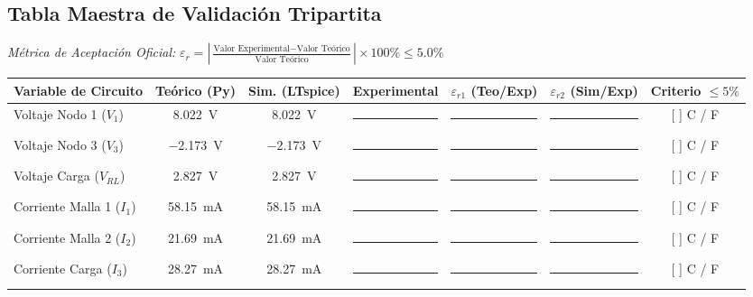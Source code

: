 \documentclass[11pt, a4paper]{article}
\begin{document}
\newpage
\begin{landscape}
\section{Tabla Maestra de Validación Tripartita}
\textit{Métrica de Aceptación Oficial:} $\varepsilon_r = \left\vert \frac{\text{Valor Experimental} - \text{Valor Teórico}}{\text{Valor Teórico}} \right\vert \times 100\% \le 5.0\%$

\vspace{0.6cm}
\begin{table}[h!]
    \centering
    \renewcommand{\arraystretch}{1.8}
    \begin{tabularx}{\linewidth}{@{}Xcccccc@{}}
        \toprule
        \textbf{Variable de Circuito} & \textbf{Teórico (Py)} & \textbf{Sim. (LTspice)} & \textbf{Experimental} & \textbf{$\varepsilon_{r1}$ (Teo/Exp)} & \textbf{$\varepsilon_{r2}$ (Sim/Exp)} & \textbf{Criterio $\le 5\%$} \\
        \midrule
        Voltaje Nodo 1 ($V_1$) & \qty{8.022}{\volt} & \qty{8.022}{\volt} & \rule{3cm}{0.4pt} & \rule{2cm}{0.4pt} & \rule{2cm}{0.4pt} & [ ] C \quad / \quad [ ] F \\
        Voltaje Nodo 3 ($V_3$) & \qty{-2.173}{\volt} & \qty{-2.173}{\volt} & \rule{3cm}{0.4pt} & \rule{2cm}{0.4pt} & \rule{2cm}{0.4pt} & [ ] C \quad / \quad [ ] F \\
        Voltaje Carga ($V_{RL}$) & \qty{2.827}{\volt} & \qty{2.827}{\volt} & \rule{3cm}{0.4pt} & \rule{2cm}{0.4pt} & \rule{2cm}{0.4pt} & [ ] C \quad / \quad [ ] F \\
        Corriente Malla 1 ($I_1$) & \qty{58.15}{\milli\ampere} & \qty{58.15}{\milli\ampere} & \rule{3cm}{0.4pt} & \rule{2cm}{0.4pt} & \rule{2cm}{0.4pt} & [ ] C \quad / \quad [ ] F \\
        Corriente Malla 2 ($I_2$) & \qty{21.69}{\milli\ampere} & \qty{21.69}{\milli\ampere} & \rule{3cm}{0.4pt} & \rule{2cm}{0.4pt} & \rule{2cm}{0.4pt} & [ ] C \quad / \quad [ ] F \\
        Corriente Carga ($I_3$) & \qty{28.27}{\milli\ampere} & \qty{28.27}{\milli\ampere} & \rule{3cm}{0.4pt} & \rule{2cm}{0.4pt} & \rule{2cm}{0.4pt} & [ ] C \quad / \quad [ ] F \\
        \bottomrule
    \end{tabularx}
\end{table}

\vspace{1cm}

\end{landscape}
\end{document}
